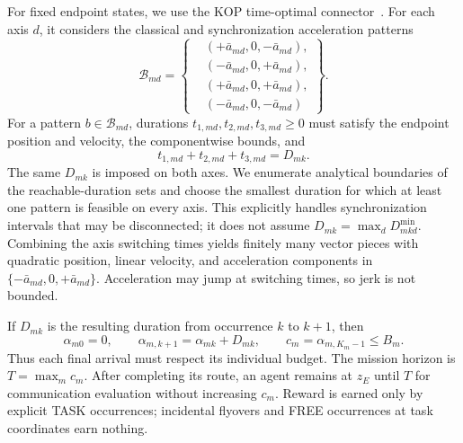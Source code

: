 For fixed endpoint states, we use the KOP time-optimal connector~\cite{meyer2022kop}. For each axis $d$, it considers the classical and synchronization acceleration patterns
\begin{equation}
 \mathcal B_{md}=\left\{
 \begin{aligned}
  &(+\bar a_{md},0,-\bar a_{md}),\\
  &(-\bar a_{md},0,+\bar a_{md}),\\
  &(+\bar a_{md},0,+\bar a_{md}),\\
  &(-\bar a_{md},0,-\bar a_{md})
 \end{aligned}
 \right\}.
 \label{eq:kop_patterns}
\end{equation}
For a pattern $b\in\mathcal B_{md}$, durations $t_{1,md},t_{2,md},t_{3,md}\ge0$ must satisfy the endpoint position and velocity, the componentwise bounds, and
\begin{equation}
 t_{1,md}+t_{2,md}+t_{3,md}=D_{mk}.
 \label{eq:axis_synchronization}
\end{equation}
The same $D_{mk}$ is imposed on both axes. We enumerate analytical boundaries of the reachable-duration sets and choose the smallest duration for which at least one pattern is feasible on every axis. This explicitly handles synchronization intervals that may be disconnected; it does not assume $D_{mk}=\max_d D^{\min}_{mkd}$. Combining the axis switching times yields finitely many vector pieces with quadratic position, linear velocity, and acceleration components in $\{-\bar a_{md},0,+\bar a_{md}\}$. Acceleration may jump at switching times, so jerk is not bounded.

If $D_{mk}$ is the resulting duration from occurrence $k$ to $k+1$, then
\begin{equation}
 \alpha_{m0}=0,\qquad \alpha_{m,k+1}=\alpha_{mk}+D_{mk},
 \qquad c_m=\alpha_{m,K_m-1}\le B_m.
 \label{eq:budget}
\end{equation}
Thus each final arrival must respect its individual budget. The mission horizon is $T=\max_m c_m$. After completing its route, an agent remains at $z_E$ until $T$ for communication evaluation without increasing $c_m$. Reward is earned only by explicit TASK occurrences; incidental flyovers and FREE occurrences at task coordinates earn nothing.

